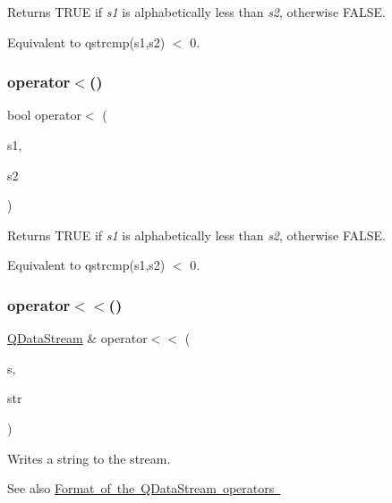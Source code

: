Returns T\+R\+UE if {\itshape s1} is alphabetically less than {\itshape s2}, otherwise F\+A\+L\+SE.

Equivalent to {\ttfamily qstrcmp(s1,s2) $<$ 0}. \mbox{\label{class_q_string_abe479c7e9bb723be856c1bcc388fb50f}} 
\subsubsection{\texorpdfstring{operator$<$()}{operator<()}\hspace{0.1cm}{\footnotesize\ttfamily [2/2]}}
{\footnotesize\ttfamily bool operator$<$ (\begin{DoxyParamCaption}\item[{const \mbox{\hyperlink{class_q_string}{Q\+String}} \&}]{s1,  }\item[{const char $\ast$}]{s2 }\end{DoxyParamCaption})\hspace{0.3cm}{\ttfamily [related]}}

Returns T\+R\+UE if {\itshape s1} is alphabetically less than {\itshape s2}, otherwise F\+A\+L\+SE.

Equivalent to {\ttfamily qstrcmp(s1,s2) $<$ 0}. \mbox{\label{class_q_string_a5d8281fc5ce5c2b6e6e9fd2b9f66c32c}} 
\subsubsection{\texorpdfstring{operator$<$$<$()}{operator<<()}}
{\footnotesize\ttfamily \mbox{\hyperlink{class_q_data_stream}{Q\+Data\+Stream}} \& operator$<$$<$ (\begin{DoxyParamCaption}\item[{\mbox{\hyperlink{class_q_data_stream}{Q\+Data\+Stream}} \&}]{s,  }\item[{const \mbox{\hyperlink{class_q_string}{Q\+String}} \&}]{str }\end{DoxyParamCaption})\hspace{0.3cm}{\ttfamily [related]}}

Writes a string to the stream.

\begin{DoxySeeAlso}{See also}
\mbox{\hyperlink{}{Format of the Q\+Data\+Stream operators }} 
\end{DoxySeeAlso}
\mbox{\label{class_q_string_a98d7107dd1903d01a5fabeab999fe398}} 
